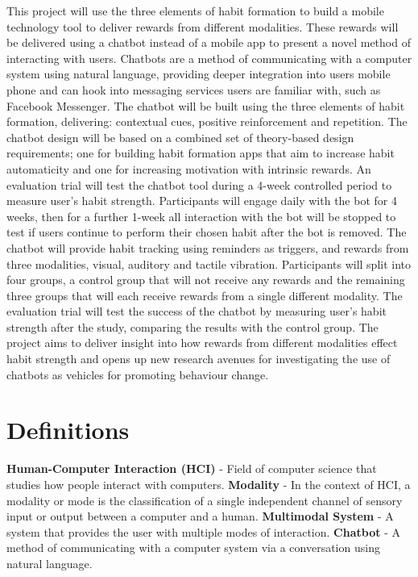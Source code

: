 This project will use the three elements of habit formation to build a mobile technology tool to deliver rewards from different modalities. These rewards will be delivered using a chatbot instead of a mobile app to present a novel method of interacting with users. Chatbots are a method of communicating with a computer system using natural language, providing deeper integration into users mobile phone and can hook into messaging services users are familiar with, such as Facebook Messenger. The chatbot will be built using the three elements of habit formation, delivering: contextual cues, positive reinforcement and repetition. The chatbot design will be based on a combined set of theory-based design requirements; one for building habit formation apps that aim to increase habit automaticity and one for increasing motivation with intrinsic rewards.\newline
\newline
An evaluation trial will test the chatbot tool during a 4-week controlled period to measure user's habit strength. Participants will engage daily with the bot for 4 weeks, then for a further 1-week all interaction with the bot will be stopped to test if users continue to perform their chosen habit after the bot is removed. The chatbot will provide habit tracking using reminders as triggers, and rewards from three modalities, visual, auditory and tactile vibration. Participants will split into four groups, a control group that will not receive any rewards and the remaining three groups that will each receive rewards from a single different modality. The evaluation trial will test the success of the chatbot by measuring user's habit strength after the study, comparing the results with the control group.\newline
\newline
The project aims to deliver insight into how rewards from different modalities effect habit strength and opens up new research avenues for investigating the use of chatbots as vehicles for promoting behaviour change.
\newpage

\section*{Definitions}

\textbf{Human-Computer Interaction (HCI)} - Field of computer science that studies how people interact with computers.\newline
\newline
\textbf{Modality} - In the context of HCI, a modality or mode is the classification of a single independent channel of sensory input or output between a computer and a human.\newline
\newline
\textbf{Multimodal System} - A system that provides the user with multiple modes of interaction.\newline
\newline
\textbf{Chatbot} - A method of communicating with a computer system via a conversation using natural language.

\newpage

